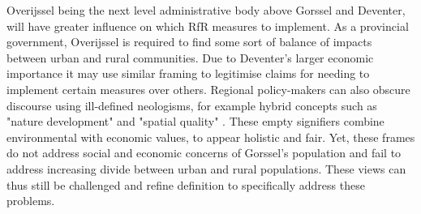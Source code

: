 Overijssel being the next level administrative body above Gorssel and Deventer, will have greater influence on which RfR measures to implement. As a provincial government, Overijssel is required to find some sort of balance of impacts between urban and rural communities. Due to Deventer's larger economic importance it may use similar framing to legitimise claims for needing to implement certain measures over others. Regional policy-makers can also obscure discourse using ill-defined neologisms, for example hybrid concepts such as "nature development" and "spatial quality" \parencite{warner_implementing_2011}. These empty signifiers combine environmental with economic values, to appear holistic and fair. Yet, these frames do not address social and economic concerns of Gorssel's population and fail to address increasing divide between urban and rural populations. These views can thus still be challenged and refine definition to specifically address these problems.

